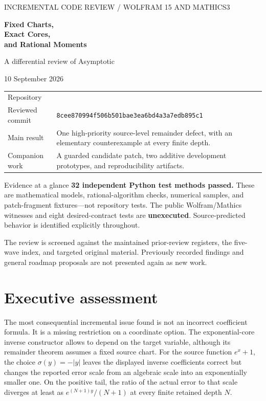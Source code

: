 \documentclass[11pt,letterpaper]{article}
\newcommand{\code}[1]{\texttt{\detokenize{#1}}}
\begin{document}
\begin{titlepage}
\thispagestyle{empty}
{\small\sffamily\color{accent}INCREMENTAL CODE REVIEW \quad / \quad WOLFRAM 15 AND MATHICS3\par}
\vspace{1.0in}
{\fontsize{31}{35}\selectfont\bfseries\color{ink}Fixed Charts,\\Exact Cores,\\and Rational Moments\par}
\vspace{.25in}
{\Large\color{muted}A differential review of Asymptotic\par}
\vspace{.42in}
{\large 10 September 2026\par}
\vspace{.35in}
\begin{tabularx}{\textwidth}{@{}lX@{}}
Repository & \code{VladimirReshetnikov/Asymptotic}\\[5pt]
Reviewed commit & \small\texttt{8cee870994f506b501bae3ea6bd4a3a7edb895c1}\\[5pt]
Main result & One high-priority source-level remainder defect, with an elementary counterexample at every finite depth.\\[5pt]
Companion work & A guarded candidate patch, two additive development prototypes, and reproducibility artifacts.\\
\end{tabularx}
\vfill
\begin{reviewbox}{Evidence at a glance}
\textbf{32 independent Python test methods passed.} These are mathematical models, rational-algorithm checks, numerical samples, and patch-fragment fixtures---not repository tests. The public Wolfram/Mathics witnesses and eight desired-contract tests are \textbf{unexecuted}. Source-predicted behavior is identified explicitly throughout.
\end{reviewbox}
\vspace{.15in}
{\small\color{muted}The review is screened against the maintained prior-review registers, the five-wave index, and targeted original material. Previously recorded findings and general roadmap proposals are not presented again as new work.}
\end{titlepage}

\section*{Executive assessment}
The most consequential incremental issue found is not an incorrect coefficient formula. It is a missing restriction on a coordinate option. The exponential-core inverse constructor allows \code{SourceShift} to depend on the target variable, although its remainder theorem assumes a fixed source chart. For the source function $e^x+1$, the choice $\sigma(y)=-|y|$ leaves the displayed inverse coefficients correct but changes the reported error scale from an algebraic scale into an exponentially smaller one. On the positive tail, the ratio of the actual error to that scale diverges at least as $e^{(N+1)y}/(N+1)$ at every finite retained depth $N$.
\end{document}
